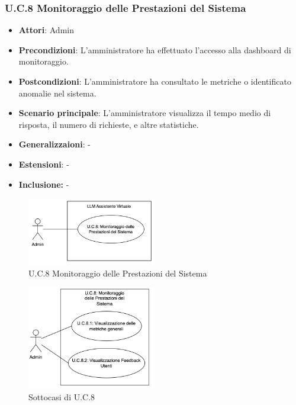 \subsubsection{U.C.8 Monitoraggio delle Prestazioni del Sistema}
\begin{itemize}
    \item \textbf{Attori}: Admin
    \item \textbf{Precondizioni}: L’amministratore ha effettuato l’accesso alla dashboard di monitoraggio.
    \item \textbf{Postcondizioni}: L’amministratore ha consultato le metriche o identificato anomalie nel sistema.
    \item \textbf{Scenario principale}: L’amministratore visualizza il tempo medio di risposta, il numero di richieste, e altre statistiche.
    \item \textbf{Generalizzaioni}: -
    \item \textbf{Estensioni}: -
    \item \textbf{Inclusione:} -
\end{itemize}
\begin{figure}[h!]
    \centering
    \includegraphics[width=0.5\textwidth]{img/UC8.png}
    \caption{U.C.8 Monitoraggio delle Prestazioni del Sistema}
\end{figure}
\begin{figure}[h!]
    \centering
    \includegraphics[width=0.5\textwidth]{img/UC8p1.png}
    \caption{Sottocasi di U.C.8}
\end{figure}
